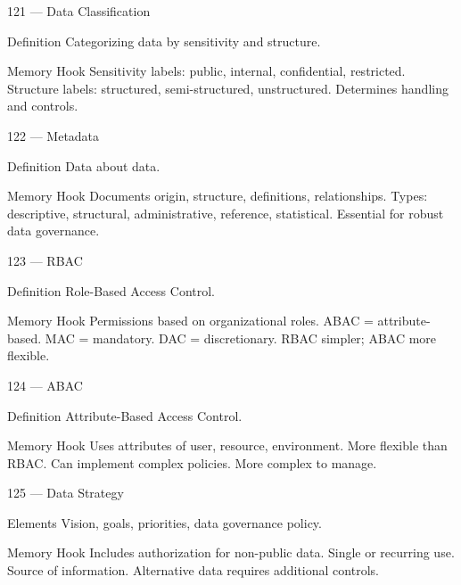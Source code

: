 \documentclass[aspectratio=169,8pt]{beamer}
\begin{document}
	\begin{frame}{121 --- Data Classification}
		\begin{block}{Definition}
			Categorizing data by sensitivity and structure.
		\end{block}
		\begin{block}{Memory Hook}
			Sensitivity labels: public, internal, confidential, restricted. Structure labels: structured, semi-structured, unstructured. Determines handling and controls.
		\end{block}
	\end{frame}
	
	\begin{frame}{122 --- Metadata}
		\begin{block}{Definition}
			Data about data.
		\end{block}
		\begin{block}{Memory Hook}
			Documents origin, structure, definitions, relationships. Types: descriptive, structural, administrative, reference, statistical. Essential for robust data governance.
		\end{block}
	\end{frame}
	
	\begin{frame}{123 --- RBAC}
		\begin{block}{Definition}
			Role-Based Access Control.
		\end{block}
		\begin{block}{Memory Hook}
			Permissions based on organizational roles. ABAC = attribute-based. MAC = mandatory. DAC = discretionary. RBAC simpler; ABAC more flexible.
		\end{block}
	\end{frame}
	
	\begin{frame}{124 --- ABAC}
		\begin{block}{Definition}
			Attribute-Based Access Control.
		\end{block}
		\begin{block}{Memory Hook}
			Uses attributes of user, resource, environment. More flexible than RBAC. Can implement complex policies. More complex to manage.
		\end{block}
	\end{frame}
	
	\begin{frame}{125 --- Data Strategy}
		\begin{block}{Elements}
			Vision, goals, priorities, data governance policy.
		\end{block}
		\begin{block}{Memory Hook}
			Includes authorization for non-public data. Single or recurring use. Source of information. Alternative data requires additional controls.
		\end{block}
	\end{frame}
	
\end{document}
